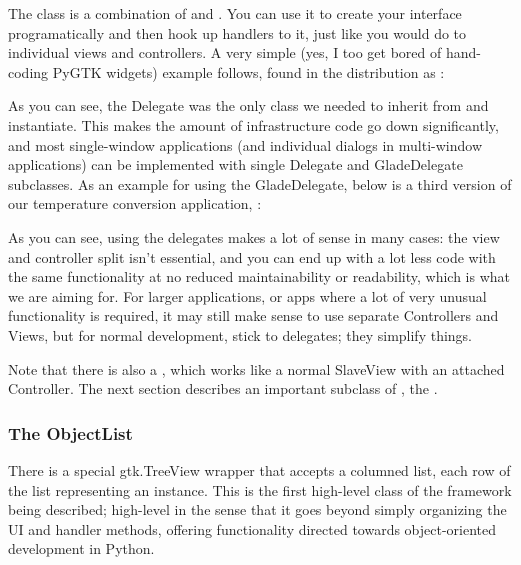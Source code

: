 \documentclass[a4paper]{howto}
\begin{document}
The  class is a combination of  and
. You can use it to create your interface
programatically and then hook up handlers to it, just like you would do
to individual views and controllers. A very simple (yes, I too get bored
of hand-coding PyGTK widgets) example follows, found in the distribution
as :





As you can see, the Delegate was the only class we needed to inherit
from and instantiate. This makes the amount of infrastructure code go
down significantly, and most single-window applications (and individual
dialogs in multi-window applications) can be implemented with single
Delegate and GladeDelegate subclasses. As an example for using the
GladeDelegate, below is a third version of our temperature conversion
application, :



As you can see, using the delegates makes a lot of sense in many cases:
the view and controller split isn't essential, and you can end up
with a lot less code with the same functionality at no reduced
maintainability or readability, which is what we are aiming for. For
larger applications, or apps where a lot of very unusual functionality
is required, it may still make sense to use separate Controllers and
Views, but for normal development, stick to delegates; they simplify
things.

Note that there is also a , which works like a
normal SlaveView with an attached Controller. The next section describes
an important subclass of , the
.

\subsubsection{The ObjectList}

There is a special gtk.TreeView wrapper that accepts a columned list,
each row of the list representing an instance. This is the first
high-level class of the framework being described; high-level in the
sense that it goes beyond simply organizing the UI and handler methods,
offering functionality directed towards object-oriented development in
Python.
\end{document}

